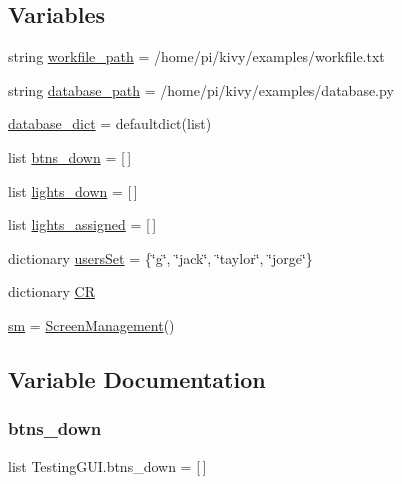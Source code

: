 \subsection*{Variables}
\begin{DoxyCompactItemize}
\item 
string \hyperlink{namespaceTestingGUI_a11c4b70f772a0a449cd7b0dabf533848}{workfile\+\_\+path} = \textquotesingle{}/home/pi/kivy/examples/workfile.\+txt\textquotesingle{}
\item 
string \hyperlink{namespaceTestingGUI_a35e81274fb7bccca150736fa44146910}{database\+\_\+path} = \textquotesingle{}/home/pi/kivy/examples/database.\+py\textquotesingle{}
\item 
\hyperlink{namespaceTestingGUI_a5a1fe398b7a7e172a18aa44b2c1793f4}{database\+\_\+dict} = defaultdict(list)
\item 
list \hyperlink{namespaceTestingGUI_a392f51b5b3ce353bf9d3f49958c05d89}{btns\+\_\+down} = \mbox{[}$\,$\mbox{]}
\item 
list \hyperlink{namespaceTestingGUI_ac086b5927511e0e2b06690ab3b412797}{lights\+\_\+down} = \mbox{[}$\,$\mbox{]}
\item 
list \hyperlink{namespaceTestingGUI_afbf31e993bfc6222d8d8bea7122e93a5}{lights\+\_\+assigned} = \mbox{[}$\,$\mbox{]}
\item 
dictionary \hyperlink{namespaceTestingGUI_a4a1b5baf3d7390a99be46eacbe5c323f}{users\+Set} = \{\char`\"{}g\char`\"{}, \char`\"{}jack\char`\"{}, \char`\"{}taylor\char`\"{}, \char`\"{}jorge\char`\"{}\}
\item 
dictionary \hyperlink{namespaceTestingGUI_af38d10d3b8204ffbe61a4ec28c035776}{CR}
\item 
\hyperlink{namespaceTestingGUI_a09440ec859deb60fe3147a2ae81bf30c}{sm} = \hyperlink{classTestingGUI_1_1ScreenManagement}{Screen\+Management}()
\end{DoxyCompactItemize}


\subsection{Variable Documentation}
\mbox{\label{namespaceTestingGUI_a392f51b5b3ce353bf9d3f49958c05d89}} 
\subsubsection{\texorpdfstring{btns\+\_\+down}{btns\_down}}
{\footnotesize\ttfamily list Testing\+G\+U\+I.\+btns\+\_\+down = \mbox{[}$\,$\mbox{]}}

